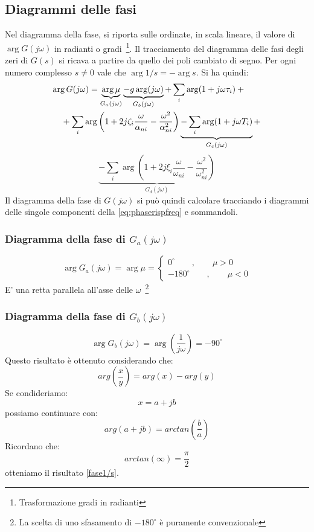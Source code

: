 \documentclass[a4paper]{report}
\begin{document}
\subsection{Diagrammi delle fasi}
Nel diagramma della fase, si riporta sulle ordinate, in scala lineare,
il valore di $\arg{G(j\omega)}$ in radianti o
gradi~\footnote{Trasformazione gradi in radianti
  }. Il tracciamento del
diagramma delle fasi degli zeri di $G(s)$ si ricava a partire da
quello dei poli cambiato di segno. Per ogni numero complesso
$s\neq0$ vale che $\arg{1/s} = -\arg{s}$. Si ha quindi:
\begin{eqnarray*}
  \lefteqn{\arg G(j\omega) = \underbrace{\arg
      \mu}_{G_a(j\omega)}\underbrace{-g\arg(j\omega)}_{G_b(j\omega)} +
    \sum_i \arg(1+j\omega \tau_i)+{} }\\
  & & {}+\sum_i \arg \left(1 + 2j\zeta_i
  \dfrac{\omega}{\alpha_{ni}} - \dfrac{\omega^2}{\alpha^2_{ni}}
  \right) \underbrace{-\sum_i
    \arg(1 + j\omega T_i)}_{G_c(j\omega)}+
\end{eqnarray*}
\begin{equation}\label{eq:phaserispfreq}
  \underbrace{-\sum_i \arg \left(1 + 2j\xi_i
    \dfrac{\omega}{\omega_{ni}} - \dfrac{\omega^2}{\omega^2_{ni}}
    \right)}_{G_d(j\omega)} 
\end{equation}
Il diagramma della fase di $G(j\omega)$ si pu\`o quindi calcolare
tracciando i diagrammi delle singole componenti della
\ref{eq:phaserispfreq} e sommandoli.

\subsubsection{Diagramma della fase di $G_a(j\omega)$}
\begin{displaymath}
  \arg G_a(j\omega)= \arg \mu = \left
  \{ \begin{array}{c}0^{\circ}\qquad,\qquad \mu >0
      \\ -180^{\circ}\qquad,\qquad \mu < 0\end{array} \right. 
\end{displaymath}
E' una retta parallela all'asse delle $\omega$~\footnote{La scelta di
  uno sfasamento di $-180^{\circ}$ \`e puramente convenzionale}

\subsubsection{Diagramma della fase di $G_b(j\omega)$}
\begin{equation}\label{fase1/s}
  \arg G_b(j\omega) = \arg \left ( \frac{1}{j\omega}\right )=-90^{\circ}
\end{equation}
Questo risultato \`e ottenuto considerando che:
\[
arg \left( \dfrac{x}{y} \right) = arg(x) - arg(y)
\]
Se condideriamo:
\[
x = a + jb
\]
possiamo continuare con:
\[
arg(a + jb) = arctan \left( \dfrac{b}{a} \right)
\]
Ricordano che:
\[
arctan(\infty) = \dfrac{\pi}{2}
\]
otteniamo il risultato \ref{fase1/s}.
\end{document}
